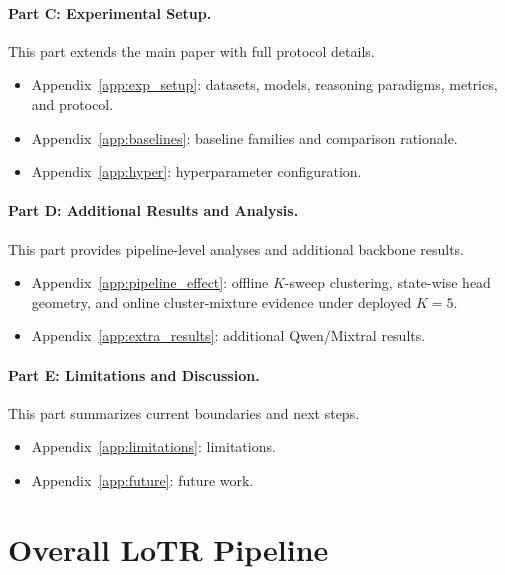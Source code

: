 \paragraph{Part C: Experimental Setup.}
This part extends the main paper with full protocol details.
\begin{itemize}[leftmargin=1.6em]
    \item Appendix~\ref{app:exp_setup}: datasets, models, reasoning paradigms, metrics, and protocol.
    \item Appendix~\ref{app:baselines}: baseline families and comparison rationale.
    \item Appendix~\ref{app:hyper}: hyperparameter configuration.
\end{itemize}

\paragraph{Part D: Additional Results and Analysis.}
This part provides pipeline-level analyses and additional backbone results.
\begin{itemize}[leftmargin=1.6em]
    \item Appendix~\ref{app:pipeline_effect}: offline \(K\)-sweep clustering, state-wise head geometry, and online cluster-mixture evidence under deployed \(K{=}5\).
    \item Appendix~\ref{app:extra_results}: additional Qwen/Mixtral results.
\end{itemize}

\paragraph{Part E: Limitations and Discussion.}
This part summarizes current boundaries and next steps.
\begin{itemize}[leftmargin=1.6em]
    \item Appendix~\ref{app:limitations}: limitations.
    \item Appendix~\ref{app:future}: future work.
\end{itemize}

\clearpage
{}

\section{Overall LoTR Pipeline}
\label{app:alg_pipeline}

